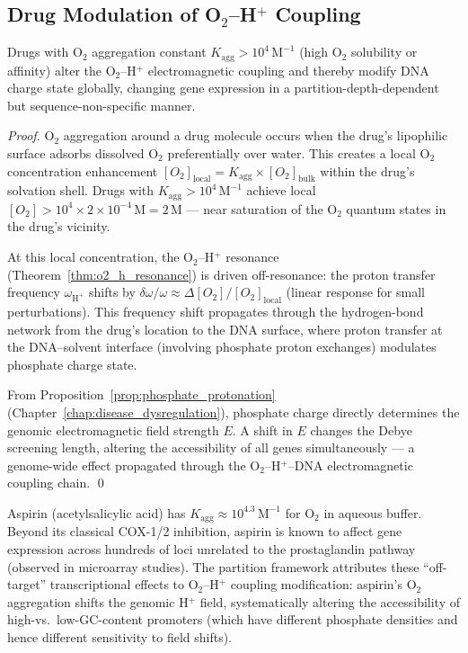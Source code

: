 \subsection{Drug Modulation of O$_2$--H$^+$ Coupling}

\begin{proposition}
\label{prop:kagg_drugs}
Drugs with O$_2$ aggregation constant $K_{\mathrm{agg}} > 10^4\,\mathrm{M}^{-1}$
(high O$_2$ solubility or affinity) alter the O$_2$--H$^+$ electromagnetic
coupling and thereby modify DNA charge state globally, changing gene expression
in a partition-depth-dependent but sequence-non-specific manner.
\end{proposition}

\begin{proof}
O$_2$ aggregation around a drug molecule occurs when the drug's lipophilic
surface adsorbs dissolved O$_2$ preferentially over water. This creates a
local O$_2$ concentration enhancement $[O_2]_{\mathrm{local}} = K_{\mathrm{agg}} \times [O_2]_{\mathrm{bulk}}$
within the drug's solvation shell. Drugs with $K_{\mathrm{agg}} > 10^4\,\mathrm{M}^{-1}$
achieve local $[O_2] > 10^4 \times 2 \times 10^{-4}\,\mathrm{M} = 2\,\mathrm{M}$
--- near saturation of the O$_2$ quantum states in the drug's vicinity.

At this local concentration, the O$_2$--H$^+$ resonance (Theorem~\ref{thm:o2_h_resonance})
is driven off-resonance: the proton transfer frequency $\omega_{\mathrm{H}^+}$
shifts by $\delta\omega/\omega \approx \Delta[O_2]/[O_2]_{\mathrm{local}}$
(linear response for small perturbations). This frequency shift propagates
through the hydrogen-bond network from the drug's location to the DNA surface,
where proton transfer at the DNA--solvent interface (involving phosphate
proton exchanges) modulates phosphate charge state.

From Proposition~\ref{prop:phosphate_protonation} (Chapter~\ref{chap:disease_dysregulation}),
phosphate charge directly determines the genomic electromagnetic field strength
$E$. A shift in $E$ changes the Debye screening length, altering the
accessibility of all genes simultaneously --- a genome-wide effect propagated
through the O$_2$--H$^+$--DNA electromagnetic coupling chain. \qed
\end{proof}

\begin{example}
Aspirin (acetylsalicylic acid) has $K_{\mathrm{agg}} \approx 10^{4.3}\,\mathrm{M}^{-1}$
for O$_2$ in aqueous buffer. Beyond its classical COX-1/2 inhibition, aspirin
is known to affect gene expression across hundreds of loci unrelated to the
prostaglandin pathway (observed in microarray studies). The partition framework
attributes these ``off-target'' transcriptional effects to O$_2$--H$^+$ coupling
modification: aspirin's O$_2$ aggregation shifts the genomic H$^+$ field,
systematically altering the accessibility of high-vs.\ low-GC-content promoters
(which have different phosphate densities and hence different sensitivity to
field shifts).
\end{example}

